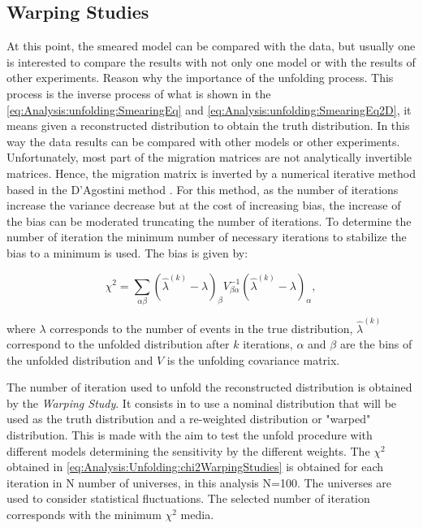 \pagebreak
\subsection{Warping Studies}
\label{Cap:Analysis:Unfolding:WarpingStudies}

At this point, the smeared model can be compared with the data, but usually one is interested to compare the results with not only one model or with the results of other experiments. Reason why the importance of the unfolding process. This process is the inverse process of what is shown in the \ref{eq:Analysis:unfolding:SmearingEq} and \ref{eq:Analysis:unfolding:SmearingEq2D}, it means given a reconstructed distribution to obtain the truth distribution. In this way the data results can be compared with other models or other experiments. Unfortunately, most part of the migration matrices are not analytically invertible matrices. Hence, the migration matrix is inverted by a numerical iterative method based in the D'Agostini method \cite{DAGOSTINI1995487}\cite{dagostini2010improved}. For this method, as the number of iterations increase the variance decrease but at the cost of increasing bias, the increase of the bias can be moderated truncating the number of iterations. To determine the number of iteration the minimum number of necessary iterations to stabilize the bias to a minimum is used. The bias is given by:

\begin{equation}
    \chi^2 = \sum_{\alpha\beta}(\hat{\lambda}^{(k)}-\lambda)_\beta V^{-1}_{\beta\alpha} (\hat{\lambda}^{(k)}-\lambda)_\alpha,
    \label{eq:Analysis:Unfolding:chi2WarpingStudies}
\end{equation}

where $\lambda$ corresponds to the number of events in the true distribution, $\hat{\lambda}^{(k)}$ correspond to the unfolded distribution after $k$ iterations, $\alpha$ and $\beta$ are the bins of the unfolded distribution and $V$ is the unfolding covariance matrix.  

The number of iteration used to unfold the reconstructed distribution is obtained by the \textit{Warping Study}. It consists in to use a nominal distribution that will be used as the truth distribution and a re-weighted distribution or "warped" distribution. This is made with the aim to test the unfold procedure with different models determining the sensitivity by the different weights. The $\chi^2$  obtained in \ref{eq:Analysis:Unfolding:chi2WarpingStudies} is obtained for each iteration in N number of universes, in this analysis N=100. The universes are used to consider statistical fluctuations. The selected number of iteration corresponds with the minimum $\chi^2$ media.

